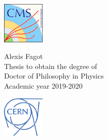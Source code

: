 \documentclass[10pt,a4paper,twoside,dutch,english,openright,leqno]{book}
\begin{document}
 \begin{minipage}{2.0cm}%
     \href{https://cms.cern/}{\includegraphics*[width=2.0cm]{CMS.pdf}}
 \end{minipage}\hfill
 \begin{minipage}{7cm}
 \centering
 \LARGE\textsf{Alexis Fagot\\}
 \vspace{5mm}
 \normalsize\textsf{Thesis to obtain the degree of\\
 Doctor of Philosophy in Physics\\
 Academic year 2019-2020}
 \end{minipage}\hfill
 \begin{minipage}{2.0cm}%
     \href{https://home.cern/}{\includegraphics*[width=2.0cm]{CERN.pdf}}
 \end{minipage}\hfill
\clearpage{\pagestyle{empty}\cleardoublepage}


\frontmatter
\renewcommand{\contentsname}{Table of Contents}
\tableofcontents

\renewcommand{\bibname}{References}

%

\mainmatter     %
\renewcommand*{\thesection}{\thechapter.\arabic{section}}

\newcommand\fdtsvrightmarktmp{{\scshape\small Chapter }}
\renewcommand\evenpagerightmark{{\scshape\small\chaptername\ \thechapter}}
\renewcommand\oddpageleftmark{{\scshape\small\leftmark}}

\newlength{\plotwidth}
\setlength{\plotwidth}{.8\textwidth}
\end{document}
